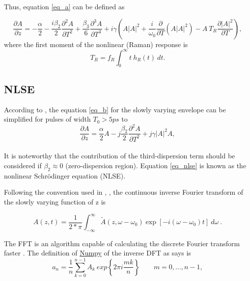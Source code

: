     Thus, equation \eqref{eq_a} can be defined as 
    
    \begin{equation}\label{eq_b}
        \frac{\partial A}{\partial z}=-\frac{\alpha}{2} - \frac{i \beta_2}{2} \frac{\partial^2 A}{\partial T^2} +\frac{\beta_3}{6} \frac{\partial^3 A}{\partial T^3} +i \gamma   \left(A\left|A\right|^2+ \frac{i}{\omega_0} \frac{\partial}{\partial T} (A\left|A \right|^2)- A \ T_R \frac{\partial \left|A \right|^2}{\partial T} \right),
        \end{equation}
    where the first moment of the nonlinear (Raman) response is
    \begin{equation}\label{eq_TR}
        T_R = f_R\int_{0}^{\infty} t \ h_R(t) \ dt.
    \end{equation}

        
    \subsection{NLSE}
        According to \citep{AgrawalBook}, the equation  \eqref{eq_b} for the slowly varying envelope can be simplified for pulses of width $T_0 > 5 ps$ to
        \begin{equation}
                \frac{\partial A}{\partial z} = \frac{\alpha}{2}A-j \frac{\beta_2}{2}\frac{\partial^2A}{\partial T^2}+j\gamma|A|^2 A,
                \label{eq_nlse}
            \end{equation}
            \ \\
       It is noteworthy that the contribution of the third-dispersion term should be considered if $\beta_2 \approx 0$ (zero-dispersion region). Equation \eqref{eq_nlse} is known as the nonlinear Schrödinger equation (NLSE).

           Following the convention used in \cite{AgrawalBook}, \cite{dudley_taylor_2010} , the continuous inverse Fourier transform of the slowly varying function of z is
        
        \begin{equation}\label{eq_acft}
            A(z,t) = \frac{1}{2*\pi} \int_{-\infty}^{\infty} \tilde{A}(z,\omega-\omega_0)\exp{[-i(\omega-\omega_0)t]} \ d\omega \ .
        \end{equation}
        
        
        The FFT is an algorithm capable of calculating the discrete Fourier transform faster \citep{Lynch2018}. The definition of \href{https://numpy.org/doc/stable/index.html}{Numpy} of the inverse DFT as \cite{dft} says is 
        \begin{equation}\label{eq_dft}
            a_n = \frac{1}{n}\sum_{k=0}^{n-1} A_k \ exp\left\{ 2\pi i \frac{mk}{n} \right\} \qquad m = 0,...,n-1,
        \end{equation}

